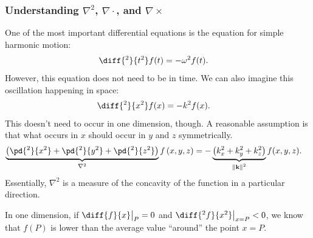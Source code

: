 \documentclass[10pt]{mypackage}
\begin{document}
\subsubsection{Understanding $\nabla^2$, $\nabla\cdot$, and $\nabla\times$}%
\begin{example}
One of the most important differential equations is the equation for simple harmonic motion:
\begin{align*}
  \diff{^2}{t^2}f(t) &= -\omega^2f(t).
\end{align*}
However, this equation does not need to be in time. We can also imagine this oscillation happening in space:
\begin{align*}
  \diff{^2}{x^2} f(x) &= -k^2f(x).
\end{align*}
This doesn't need to occur in one dimension, though. A reasonable assumption is that what occurs in $x$ should occur in $y$ and $z$ symmetrically.
\begin{align*}
  \underbrace{\left(\pd{^2}{x^2} + \pd{^2}{y^2} + \pd{^2}{z^2}\right)}_{\nabla^2}f\left(x,y,z\right) &= -\underbrace{\left(k_x^2 + k_y^2 + k_z^2\right)}_{\norm{\mathbf{k}}^2}f(x,y,z).
\end{align*}
Essentially, $\nabla^2$ is a measure of the concavity of the function in a particular direction.\newline

In one dimension, if $\diff{f}{x}\bigr\vert_{P} = 0$ and $ \diff{^2f}{x^2}\bigr\vert_{x=P} < 0$, we know that $f(P)$ is lower than the average value ``around'' the point $x=P$. 
\end{example}
\end{document}
